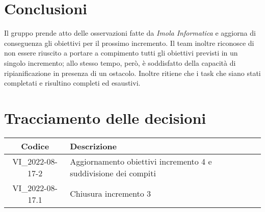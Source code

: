 \section{Conclusioni}
Il gruppo prende atto delle osservazioni fatte da \textit{Imola Informatica} e aggiorna di conseguenza gli obiettivi per il prossimo incremento. Il team inoltre riconosce di non essere riuscito a portare a compimento tutti gli obiettivi previsti in un singolo incremento; allo stesso tempo, però, è soddisfatto della capacità di ripianificazione in presenza di un ostacolo. Inoltre ritiene che i task che siano stati completati e risultino completi ed esaustivi. 
\newpage

\section*{Tracciamento delle decisioni}
	\renewcommand{\arraystretch}{1.8} %
	\begin{tabular}{ |c|l| }
		\hline
		\textbf{Codice} & \textbf{Descrizione} \\
		\hline
		VI\_2022-08-17-2 & Aggiornamento obiettivi incremento 4 e suddivisione dei compiti  \\
		\hline
		VI\_2022-08-17.1 & Chiusura incremento 3 \\
		\hline
	\end{tabular}